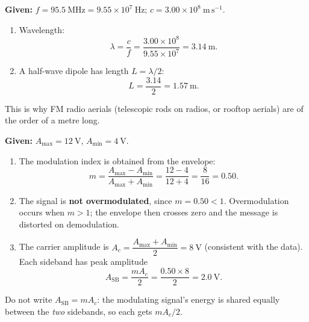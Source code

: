 \documentclass[11pt]{article}
\begin{document}
\begin{corrige}
\textbf{Given:} $f = 95.5\ \mathrm{MHz} = 9.55\times 10^{7}\ \mathrm{Hz}$; $c = 3.00\times 10^{8}\ \mathrm{m\,s^{-1}}$.

\begin{enumerate}
\item Wavelength:
\[ \lambda = \frac{c}{f} = \frac{3.00\times 10^{8}}{9.55\times 10^{7}} = 3.14\ \mathrm{m}. \]
\item A half-wave dipole has length $L = \lambda/2$:
\[ L = \frac{3.14}{2} = 1.57\ \mathrm{m}. \]
\end{enumerate}
This is why FM radio aerials (telescopic rods on radios, or rooftop aerials) are of the order of a metre long.
\end{corrige}

\begin{corrige}
\textbf{Given:} $A_{\max} = 12\ \mathrm{V}$, $A_{\min} = 4\ \mathrm{V}$.

\begin{enumerate}
\item The modulation index is obtained from the envelope:
\[ m = \frac{A_{\max} - A_{\min}}{A_{\max} + A_{\min}} = \frac{12 - 4}{12 + 4} = \frac{8}{16} = 0.50. \]
\item The signal is \textbf{not overmodulated}, since $m = 0.50 < 1$. Overmodulation occurs when $m > 1$; the envelope then crosses zero and the message is distorted on demodulation.
\item The carrier amplitude is $A_c = \dfrac{A_{\max}+A_{\min}}{2} = 8\ \mathrm{V}$ (consistent with the data). Each sideband has peak amplitude
\[ A_{\text{SB}} = \frac{m A_c}{2} = \frac{0.50 \times 8}{2} = 2.0\ \mathrm{V}. \]
\end{enumerate}
\begin{attention}
Do not write $A_{\text{SB}} = mA_c$: the modulating signal's energy is shared equally between the \emph{two} sidebands, so each gets $mA_c/2$.
\end{attention}
\end{corrige}
\end{document}
